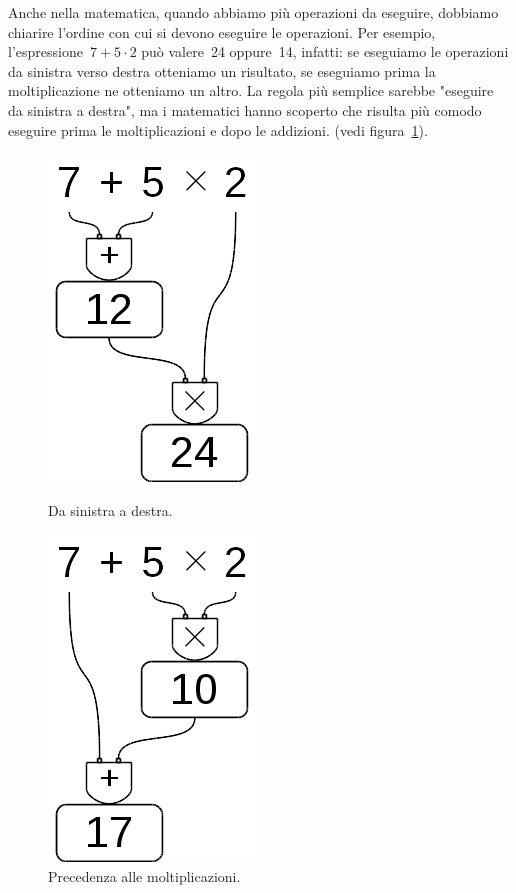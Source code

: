 Anche nella matematica, quando abbiamo più operazioni da eseguire, dobbiamo 
chiarire l'ordine con cui si devono eseguire le operazioni. 
Per esempio, l'espressione~\(7+5\cdot2\) può valere~24 oppure~14, infatti:
se eseguiamo le operazioni da sinistra verso destra otteniamo un risultato, 
se eseguiamo prima la moltiplicazione ne otteniamo un altro.
La regola più semplice sarebbe "eseguire da sinistra a destra", ma i 
matematici hanno scoperto che risulta più comodo eseguire prima le
moltiplicazioni e dopo le addizioni.
(vedi figura~\ref{fig:op_prec2}).
 
\begin{inaccessibleblock}[]
\begin{figure}[h]
 \centering
 \begin{minipage}[t]{.40\textwidth}
  \centering\includegraphics[scale=0.35]{img/op_prec1.png}
  \caption{Da sinistra a destra.}\label{fig:op_prec1}
 \end{minipage}\hfil
 \begin{minipage}[t]{.50\textwidth}
  \centering\includegraphics[scale=0.35]{img/op_prec2.png}
  \caption{Precedenza alle moltiplicazioni.}\label{fig:op_prec2}
 \end{minipage}
\end{figure}
\end{inaccessibleblock}
